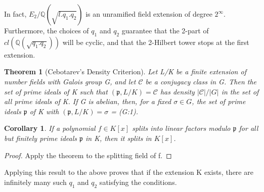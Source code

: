 \documentclass[preprint,12pt,reqno]{elsarticle}
\newtheorem{theorem}{Theorem}
\newtheorem{corollary}{Corollary}[theorem]
\begin{document}
\begin{center}
\end{center}
In fact, $E_2/\mathbb{Q}(\sqrt{l.q_1.q_2})$ is an unramified field extension of degree $2^{\infty}$. Furthermore, the choices of $q_1$ and $q_2$ guarantee that the 2-part of $cl(\mathbb{Q}(\sqrt{q_1.q_2}))$ will be cyclic, and that the 2-Hilbert tower stops at the first extension. 
\begin{theorem}[Cebotarev's Density Criterion]
Let L/K be a finite extension of
number fields with Galois group G, and let $\mathcal{C}$ be a conjugacy class in G. Then the set of
prime ideals of K such that $(\mathfrak{p},L/K)=\mathcal{C}$ has density $|\mathcal{C}|/|G|$ in the set of all prime
ideals of K. If G is abelian, then, for a fixed $\sigma\in G$, the set of prime ideals $\mathfrak{p}$ of K with $(\mathfrak{p},L/K)=\sigma$  = (G:1).
\end{theorem}
\begin{corollary}
 If a polynomial $f \in K[x]$ splits into linear factors modulo $\mathfrak{p}$ for all but finitely prime ideals $\mathfrak{p}$ in K, then it splits in $K[x]$.
\end{corollary}
\begin{proof}
Apply the theorem to the splitting field of f.
\end{proof}
Applying this result to the above proves that if the extension K exists, there are infinitely many such $q_1$ and $q_2$ satisfying the conditions. 
\end{document}
